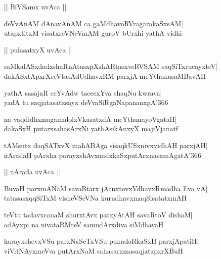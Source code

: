 \documentclass[twoside,12pt,openright]{book}
\newcounter{shloka}[chapter]
\begin{document}
\begin{center}
|| BiVSamx uvAca ||
\end{center}
\begin{shloka}%
deVvAnAM dAnavAnAM ca gaMdhavoRVragarakaSxsAM|\\
utapxtitxM visatxreVNeVmAM guroV bUrxhi yathA vidhi
\end{shloka}

\begin{center}
|| pulasatxyX uvAca ||
\end{center}
\begin{shloka}%
saMkalASxdadxshaRnAtasxpXshARtasxveRVSAM saqSiTxrucayxteV|\\
dakASxtApxrXceVtasAdUdhavxRM parxjA meYthunasaMBavAH
\end{shloka}

\begin{shloka}%
yathA sasajaR ceYvAdw tacecxYva shaqNu kwrava|\\
yadA tu saqjatasatxsayx deVvaSiRgaNapananxgA\char'366
\end{shloka}

\begin{shloka}%
na vaqdidhxmagamalolxVkasatxdA meYthunayoVgataH|\\
dakaSxH putarxsahasArxNi yathAsikAnxyX majiVjanatf
\end{shloka}

\begin{shloka}%
tAMsutx daqSATxvX mahABAga sisaqkUSxnivxvidhAH parxjAH|\\
nAradaH pArxha parayxshAvxnadxkaSxputArxnasxmAgatA\char'366
\end{shloka}

\begin{center}
|| nArada uvAca ||
\end{center}
\begin{shloka}%
BuvaH parxmANaM savaRtarx jAcnxtovxVdhavxRmadha Eva vA|\\
tatasasxqqSiTxM visheVSeVNa kurudhavxmaqSisatatxmAH
\end{shloka}

\begin{shloka}%
teVtu tadavxcanaM shurxtAvx parxyAtAH savaRtoV dishaM|\\
adAyxpi na nivataRMteV samudArxdiva siMdhavaH
\end{shloka}

\begin{shloka}%
harayxshevxVSu parxNaSeTxVSu punadaRkaSxH parxjApatiH|\\
viVriNAyxmeVva putArxNaM sahasarxmasaqjatapxrXBuH
\end{shloka}
\end{document}
